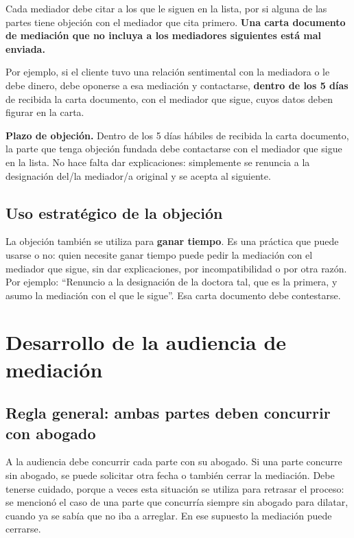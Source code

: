 \documentclass[12pt,oneside]{book}
\begin{document}
Cada mediador debe citar a los que le siguen en la lista, por si alguna de las partes tiene objeción con el mediador que cita primero. \textbf{Una carta documento de mediación que no incluya a los mediadores siguientes está mal enviada.}

Por ejemplo, si el cliente tuvo una relación sentimental con la mediadora o le debe dinero, debe oponerse a esa mediación y contactarse, \textbf{dentro de los 5 días} de recibida la carta documento, con el mediador que sigue, cuyos datos deben figurar en la carta.

\begin{important}
\textbf{Plazo de objeción.} Dentro de los 5 días hábiles de recibida la carta documento, la parte que tenga objeción fundada debe contactarse con el mediador que sigue en la lista. No hace falta dar explicaciones: simplemente se renuncia a la designación del/la mediador/a original y se acepta al siguiente.
\end{important}

\subsection{Uso estratégico de la objeción}

La objeción también se utiliza para \textbf{ganar tiempo}. Es una práctica que puede usarse o no: quien necesite ganar tiempo puede pedir la mediación con el mediador que sigue, sin dar explicaciones, por incompatibilidad o por otra razón. Por ejemplo: ``Renuncio a la designación de la doctora tal, que es la primera, y asumo la mediación con el que le sigue''. Esa carta documento debe contestarse.

\section{Desarrollo de la audiencia de mediación}

\subsection{Regla general: ambas partes deben concurrir con abogado}

A la audiencia debe concurrir cada parte con su abogado. Si una parte concurre sin abogado, se puede solicitar otra fecha o también cerrar la mediación. Debe tenerse cuidado, porque a veces esta situación se utiliza para retrasar el proceso: se mencionó el caso de una parte que concurría siempre sin abogado para dilatar, cuando ya se sabía que no iba a arreglar. En ese supuesto la mediación puede cerrarse.
\end{document}
